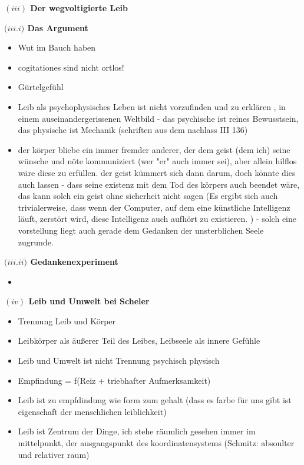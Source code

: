 \documentclass[a4paper, 12pt]{article}
\begin{document}
\begin{onehalfspace}
\vspace{5mm}
\noindent\textbf{$(iii)$ Der wegvoltigierte Leib}

\vspace{3mm}
\noindent\textbf{$(iii.$\footnotesize$i$\normalsize$)$ Das Argument}

\begin{itemize}
  \item Wut im Bauch haben
  \item cogitationes sind nicht ortlos!
  \item Gürtelgefühl
  \item Leib als psychophysisches Leben ist nicht vorzufinden und zu erklären , in einem auseinandergerissenen Weltbild - das psychische ist reines Bewusstsein, das physische ist Mechanik (schriften aus dem nachlass III 136)
  \item der körper bliebe ein immer fremder anderer, der dem geist (dem ich) seine wünsche und nöte kommuniziert (wer "er" auch immer sei), aber allein hilflos wäre diese zu erfüllen. der geist kümmert sich dann darum, doch könnte dies auch lassen - dass seine existenz mit dem Tod des körpers auch beendet wäre, das kann solch ein geist ohne sicherheit nicht sagen (Es ergibt sich auch trivialerweise, dass wenn der Computer, auf dem eine künstliche Intelligenz läuft, zerstört wird, diese Intelligenz auch aufhört zu existieren. ) - solch eine vorstellung liegt auch gerade dem Gedanken der unsterblichen Seele zugrunde. 
\end{itemize}

\vspace{3mm}
\noindent\textbf{$(iii.$\footnotesize$ii$\normalsize$)$ Gedankenexperiment}

\begin{itemize}
  \item 
\end{itemize}


\vspace{5mm}
\noindent\textbf{$(iv)$ Leib und Umwelt bei Scheler}

\begin{itemize}
  \item Trennung Leib und Körper
  \item Leibkörper als äußerer Teil des Leibes, Leibseele als innere Gefühle
  \item Leib und Umwelt ist nicht Trennung psychisch physisch
  \item Empfindung = f(Reiz + triebhafter Aufmerksamkeit)
  \item Leib ist zu empfdindung wie form zum gehalt (dass es farbe für uns gibt ist eigenschaft der menschlichen leiblichkeit)
  \item Leib ist Zentrum der Dinge, ich stehe räumlich gesehen immer im mittelpunkt, der ausgangspunkt des koordinatensystems (Schmitz: absoulter und relativer raum)
\end{itemize}


\end{onehalfspace}
\end{document}
